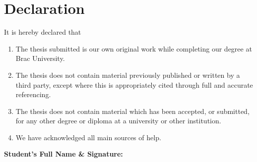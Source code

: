 \section*{Declaration}

It is hereby declared that

\begin{enumerate}
  \item The thesis submitted is our own original work while completing our degree at Brac University.

  \item The thesis does not contain material previously published or written by a third party, except where this is appropriately cited through full and accurate referencing.

  \item The thesis does not contain material which has been accepted, or submitted, for any other degree or diploma at a university or other institution.

  \item We have acknowledged all main sources of help.
\end{enumerate}

\vspace{1.2cm}

\textbf{Student's Full Name \& Signature:}

\vspace{0.35cm}

